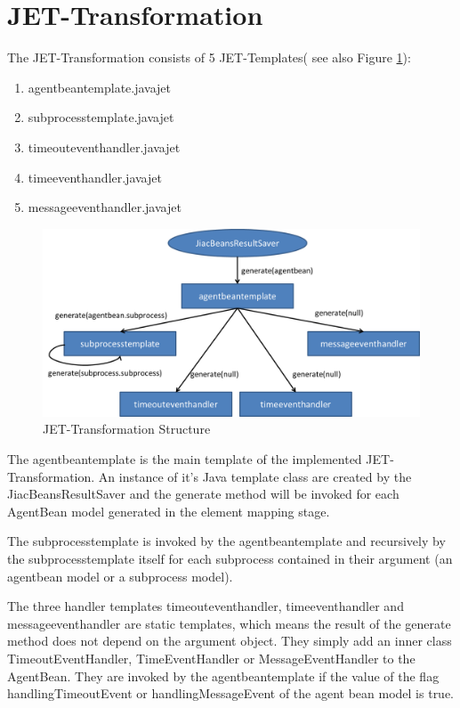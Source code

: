 \section{JET-Transformation}
The JET-Transformation consists of 5 JET-Templates( see also Figure \ref{fig:transformation_structure}): 
\begin{enumerate}
	\item agentbeantemplate.javajet
	\item subprocesstemplate.javajet
	\item timeouteventhandler.javajet
	\item timeeventhandler.javajet
	\item messageeventhandler.javajet
\end{enumerate}

\begin{figure}[h]
	\centering\includegraphics[width=1.0\textwidth]{images/templates_structure.png}
	\caption{JET-Transformation Structure}
	\label{fig:transformation_structure}
\end{figure}

The agentbeantemplate is the main template of the implemented JET-Transformation. An instance of it's Java template class are created by the JiacBeansResultSaver and the generate method will be invoked for each AgentBean model generated in the element mapping stage. 

The subprocesstemplate is invoked by the agentbeantemplate and recursively by the subprocesstemplate itself for each subprocess contained in their argument (an agentbean model or a subprocess model). 

The three handler templates timeouteventhandler, timeeventhandler and messageeventhandler are static templates, which means the result of the generate method does not depend on the argument object. They simply add an inner class TimeoutEventHandler, TimeEventHandler or MessageEventHandler to the AgentBean. They are invoked by the agentbeantemplate if the value of the flag handlingTimeoutEvent or handlingMessageEvent of the agent bean model is true.


